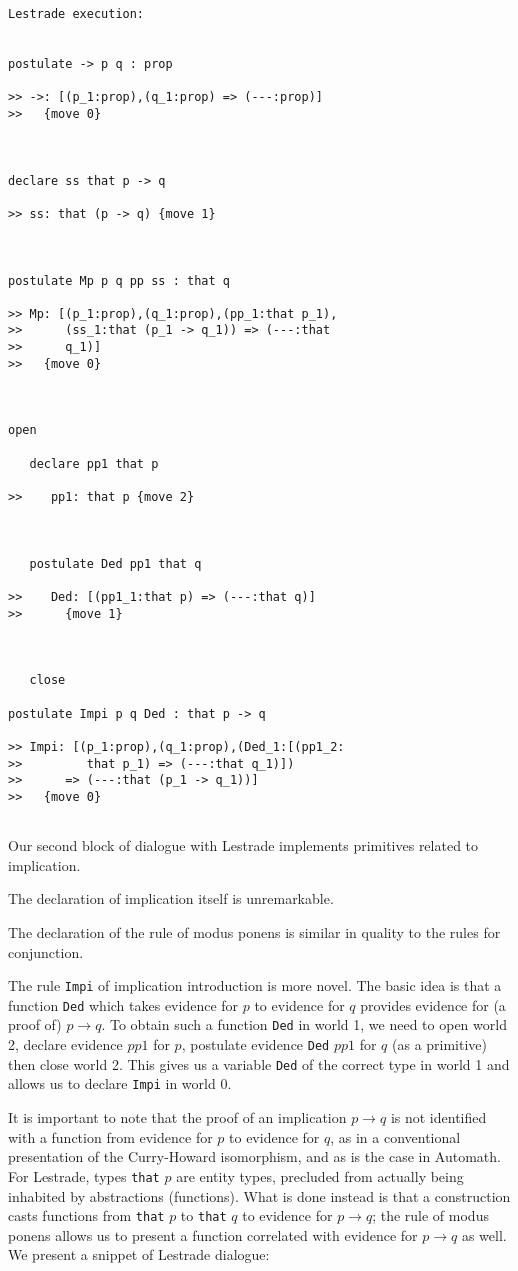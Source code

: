 \documentclass[12pt]{article}
\begin{document}
\begin{verbatim}Lestrade execution:


postulate -> p q : prop

>> ->: [(p_1:prop),(q_1:prop) => (---:prop)]
>>   {move 0}



declare ss that p -> q

>> ss: that (p -> q) {move 1}



postulate Mp p q pp ss : that q

>> Mp: [(p_1:prop),(q_1:prop),(pp_1:that p_1),
>>      (ss_1:that (p_1 -> q_1)) => (---:that
>>      q_1)]
>>   {move 0}



open

   declare pp1 that p

>>    pp1: that p {move 2}



   postulate Ded pp1 that q

>>    Ded: [(pp1_1:that p) => (---:that q)]
>>      {move 1}



   close

postulate Impi p q Ded : that p -> q

>> Impi: [(p_1:prop),(q_1:prop),(Ded_1:[(pp1_2:
>>         that p_1) => (---:that q_1)])
>>      => (---:that (p_1 -> q_1))]
>>   {move 0}


\end{verbatim}

Our second block of dialogue with Lestrade implements primitives related to implication.

The declaration of implication itself is unremarkable.

The declaration of the rule of modus ponens is similar in quality to the rules for conjunction.

The rule {\tt Impi} of implication introduction is more novel.  The basic idea is that a function {\tt Ded} which takes evidence for $p$ to evidence for $q$ provides evidence for (a proof of) $p \rightarrow q$.   To obtain such a function {\tt Ded} in world 1, we need to open world 2, declare evidence $pp1$ for $p$, postulate evidence {\tt Ded} $pp1$ for $q$
(as a primitive) then close world 2.  This gives us a variable {\tt Ded} of the correct type in world 1 and allows us to declare {\tt Impi} in world 0.

It is important to note that the proof of an implication $p \rightarrow q$ is not identified with a function from evidence for $p$ to evidence for $q$, as in a conventional presentation of the Curry-Howard isomorphism, and as is the case in Automath.  For Lestrade, types {\tt that} $p$  are entity types, precluded from actually being inhabited by abstractions (functions).   What is done instead is that a construction casts functions from {\tt that} $p$ to {\tt that} $q$ to evidence for $p \rightarrow q$; the rule of modus ponens allows us to present a function correlated with evidence for $p \rightarrow q$ as well.  We present a snippet of Lestrade dialogue:
\end{document}
